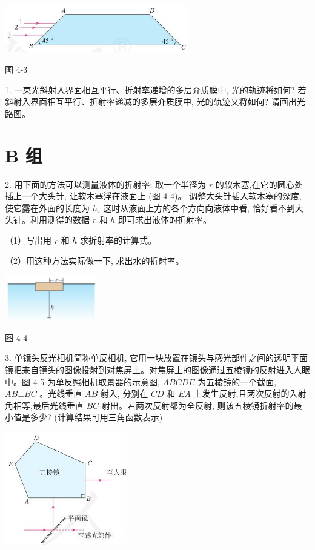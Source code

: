 \documentclass[10pt]{article}
\begin{document}
\begin{center}
\includegraphics[max width=0.6\textwidth]{images/01910e4c-ebb8-7d2c-8f2f-2375bc1d2d12_119_718190.jpg}
\end{center}

图 4-3

1. 一束光斜射入界面相互平行、折射率递增的多层介质膜中, 光的轨迹将如何? 若斜射入界面相互平行、折射率递减的多层介质膜中, 光的轨迹又将如何? 请画出光路图。

\section*{B 组}

2. 用下面的方法可以测量液体的折射率: 取一个半径为 \(r\) 的软木塞,在它的圆心处插上一个大头针, 让软木塞浮在液面上 (图 4-4)。 调整大头针插入软木塞的深度, 使它露在外面的长度为 \({h}_{ \circ }\) 这时从液面上方的各个方向向液体中看, 恰好看不到大头针。利用测得的数据 \(r\) 和 \(h\) 即可求出液体的折射率。

（1）写出用 \(r\) 和 \(h\) 求折射率的计算式。

（2）用这种方法实际做一下, 求出水的折射率。

\begin{center}
\includegraphics[max width=0.3\textwidth]{images/01910e4c-ebb8-7d2c-8f2f-2375bc1d2d12_120_191402.jpg}
\end{center}

图 4-4

3. 单镜头反光相机简称单反相机, 它用一块放置在镜头与感光部件之间的透明平面镜把来自镜头的图像投射到对焦屏上。对焦屏上的图像通过五棱镜的反射进入人眼中。图 4-5 为单反照相机取景器的示意图, \({ABCDE}\) 为五棱镜的一个截面, \({AB} \bot {BC}\) 。光线垂直 \({AB}\) 射入, 分别在 \({CD}\) 和 \({EA}\) 上发生反射,且两次反射的入射角相等,最后光线垂直 \({BC}\) 射出。若两次反射都为全反射, 则该五棱镜折射率的最小值是多少? (计算结果可用三角函数表示)

\begin{center}
\includegraphics[max width=0.4\textwidth]{images/01910e4c-ebb8-7d2c-8f2f-2375bc1d2d12_120_639576.jpg}
\end{center}
\end{document}
